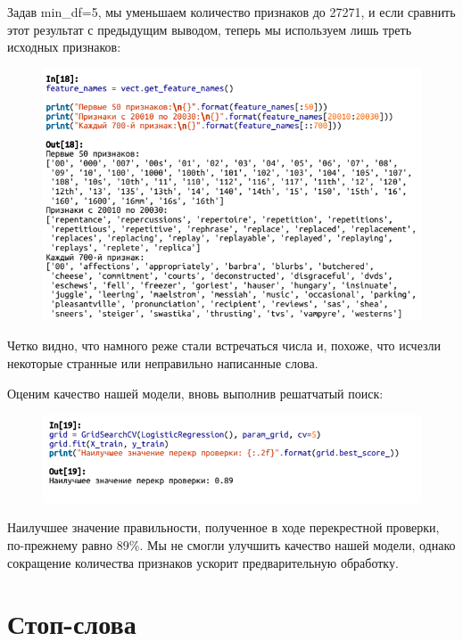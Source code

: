 \documentclass{beamer}
\begin{document}
\begin{frame}
Задав min\_df=5, мы уменьшаем количество признаков до 27271, и если сравнить этот результат с предыдущим выводом, теперь мы используем лишь треть исходных признаков: 
\begin{figure}[h]
\centering
\includegraphics[scale=0.5]{images/lec09-pic17.png}
\end{figure}
\end{frame}

\begin{frame}
Четко видно, что намного реже стали встречаться числа и, похоже, что
исчезли некоторые странные или неправильно написанные слова. 

Оценим качество нашей модели, вновь выполнив решатчатый поиск: 
\begin{figure}[h]
\centering
\includegraphics[scale=0.6]{images/lec09-pic18.png}
\end{figure}
Наилучшее значение правильности, полученное в ходе перекрестной проверки, по-прежнему равно 89\%. Мы не смогли улучшить качество нашей модели, однако сокращение количества признаков ускорит предварительную обработку.
\end{frame}

\section{Стоп-слова}
\end{document}
